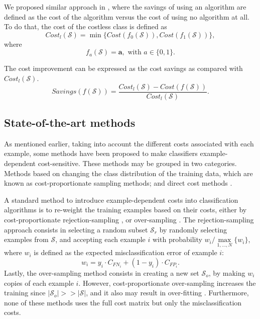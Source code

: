   We proposed similar approach in \citep{CorreaBahnsen2014b}, where the savings of using an 
  algorithm  are defined as the cost of the algorithm versus the cost of using no algorithm at all. 
  To do that, the cost of the costless class is defined as 
  \begin{equation}
    Cost_l(\mathcal{S}) = \min \{Cost(f_0(\mathcal{S})), Cost(f_1(\mathcal{S}))\},
  \end{equation}
  where 
  \begin{equation}\label{eq:2:f_a}
    f_a(\mathcal{S}) = \mathbf{a}, \text{ with } a\in \{0,1\}.
  \end{equation}

  The cost improvement can be expressed as the cost savings as compared with $Cost_l(\mathcal{S})$. 
  \begin{equation}\label{eq:2:savings}
    Savings(f(\mathcal{S})) = \frac{ Cost_l(\mathcal{S}) - Cost(f(\mathcal{S}))}
    {Cost_l(\mathcal{S})}.
  \end{equation} 


\subsection{State-of-the-art methods}

  As mentioned earlier, taking into account the different costs associated with each example, 
  some methods have been proposed to make classifiers example-dependent cost-sensitive. These 
  methods may be grouped in two categories. Methods based on changing the class distribution of 
  the training data, which are known as cost-proportionate sampling methods; and direct cost 
  methods \citep{Wang2013}.

  A standard method to introduce example-dependent costs into classification algorithms is to 
  re-weight the training examples based on their costs, either by cost-proportionate 
  rejection-sampling \citep{Zadrozny2003}, or over-sampling \citep{Elkan2001}. The 
  rejection-sampling approach consists in selecting a random subset $\mathcal{S}_{r}$  by 
  randomly  selecting examples from $\mathcal{S}$, and accepting each example $i$ with 
  probability $w_i/ \max\limits_{1,\dots, N}\{w_i\}$, where $w_i$ is defined as the expected 
  misclassification error of example $i$:
  \begin{equation}\label{eq_pred1}
    w_i = y_i\cdot C_{FN_i}+(1-y_i)\cdot C_{FP_i}.
  \end{equation}
  Lastly, the over-sampling method consists in creating a new set $\mathcal{S}_{o}$, by making 
  $w_i$ copies of each example $i$. However, cost-proportionate over-sampling increases the 
  training  since $\vert \mathcal{S}_{o}\vert >> \vert \mathcal{S} \vert$, and it also may result 
  in over-fitting  \citep{Drummond2003}. Furthermore, none of these methods uses the full cost 
  matrix but only the  misclassification costs.

